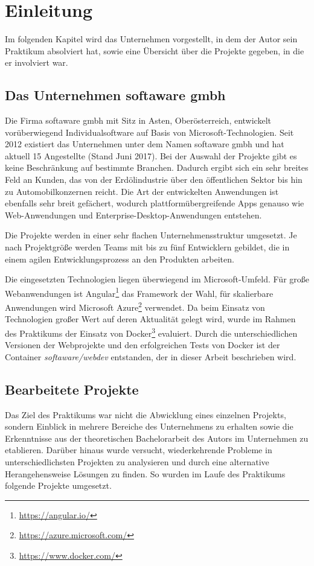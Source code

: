 \chapter{Einleitung}
\label{cha:introduction}

Im folgenden Kapitel wird das Unternehmen vorgestellt, in dem der Autor sein Praktikum absolviert hat, sowie eine Übersicht über die Projekte gegeben, in die er involviert war.

\section{Das Unternehmen softaware gmbh}
\label{sec:softaware}
Die Firma softaware gmbh mit Sitz in Asten, Oberösterreich, entwickelt vorüberwiegend Individualsoftware auf Basis von Microsoft-Technologien.
Seit 2012 existiert das Unternehmen unter dem Namen softaware gmbh und hat aktuell 15 Angestellte (Stand Juni 2017).
Bei der Auswahl der Projekte gibt es keine Beschränkung auf bestimmte Branchen.
Dadurch ergibt sich ein sehr breites Feld an Kunden, das von der Erdölindustrie über den öffentlichen Sektor bis hin zu Automobilkonzernen reicht.
Die Art der entwickelten Anwendungen ist ebenfalls sehr breit gefächert, wodurch plattformübergreifende Apps genauso wie Web-Anwendungen und Enterprise-Desktop-Anwendungen entstehen.

Die Projekte werden in einer sehr flachen Unternehmensstruktur umgesetzt.
Je nach Projektgröße werden Teams mit bis zu fünf Entwicklern gebildet, die in einem agilen Entwicklungsprozess an den Produkten arbeiten.

Die eingesetzten Technologien liegen überwiegend im Microsoft-Umfeld.
Für große Webanwendungen ist Angular\footnote{\url{https://angular.io/}} das Framework der Wahl, für skalierbare Anwendungen wird Microsoft Azure\footnote{\url{https://azure.microsoft.com/}} verwendet.
Da beim Einsatz von Technologien großer Wert auf deren Aktualität gelegt wird, wurde im Rahmen des Praktikums der Einsatz von Docker\footnote{\url{https://www.docker.com/}} evaluiert.
Durch die unterschiedlichen Versionen der Webprojekte und den erfolgreichen Tests von Docker ist der Container \emph{softaware/webdev} entstanden, der in dieser Arbeit beschrieben wird.


\section{Bearbeitete Projekte}
\label{sec:projects}

Das Ziel des Praktikums war nicht die Abwicklung eines einzelnen Projekts, sondern Einblick in mehrere Bereiche des Unternehmens zu erhalten sowie die Erkenntnisse aus der theoretischen Bachelorarbeit des Autors im Unternehmen zu etablieren.
Darüber hinaus wurde versucht, wiederkehrende Probleme in unterschiedlichsten Projekten zu analysieren und durch eine alternative Herangehensweise Lösungen zu finden.
So wurden im Laufe des Praktikums folgende Projekte umgesetzt.

